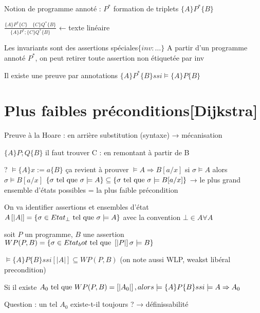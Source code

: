 \documentclass[10pt,a4paper]{article}
\newcommand{\semm}[1]{\left[| #1 | \right]}
\newcommand{\semh}[3]{\{#1\}#2\{#3\}}
\begin{document}
Notion de programme annoté : $P^*$
formation de triplets $\semh{A}{P^*}{B}$
\begin{ex}
 $\frac{\semh{A}{P^*}{C} \quad \semh{C}{Q^*}{B}}{\semh{A}{P^*;\{C\} Q^*}{B}}$ ← texte linéaire
\end{ex}
Les invariants sont des assertions spéciales$ \{inv: \dots \}$
A partir d'un programme annoté $P^*$, on peut retirer toute assertion non étiquetée par inv

\begin{thm}
 Il existe une preuve par annotations $\semh{A}{P^*}{B} ssi \models \semh{A}{P}{B}$
\end{thm}


\section{Plus faibles préconditions[Dijkstra]}

Preuve à la Hoare : en arrière
		    substitution (syntaxe)
	→ mécanisation 

$\semh{A}{P;Q}{B}$ il faut trouver C : en remontant à partir de B

? $\models \semh{A}{x:=a}{B}$ ça revient à prouver $\models A \Rightarrow B[a/x]$
					      si $\sigma \models A$ alors $\sigma \models B[a/x]$
					     $ \{\sigma \text{ tel que } \sigma \models A \} \subseteq \{\sigma \text{ tel que } \sigma \models B[a /x]\}$
→ le plus grand ensemble d'états possibles = la plus faible précondition

On va identifier assertions et ensembles d'état
		 $   A          \semm{A} = \{\sigma \in Etat_\bot \tq \sigma \models A \}$
				    avec la convention $\bot \in A \forall A$

\begin{definition}
 soit $P$ un programme, $B$ une assertion
 $WP(P,B) = \{ \sigma \in Etat_bot \tq \semm{P} \sigma \models B \}$
\end{definition}

\begin{prop}
 $\models \semh{A}{P}{B} ssi \semm{A} \subseteq WP(P,B)$ (on note aussi WLP, weakst libéral precondition)
\end{prop}

\begin{cor}
 Si il existe $A_0 \tq WP(P,B) = \semm{A_0}, alors \models \semh{A}{P}{B} ssi \models A \Rightarrow A_0$
\end{cor}

Question : un tel $A_0$ existe-t-il toujours ? → définissabilité
\end{document}
